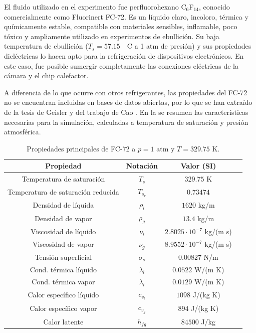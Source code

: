 El fluido utilizado en el experimento fue perfluorohexano C$_6$F$_{14}$, conocido comercialmente como Fluorinert FC-72. Es un l\'iquido claro, incoloro, t\'ermica y qu\'imicamente estable, compatible con materiales sensibles, inflamable, poco t\'oxico y ampliamente utilizado en experimentos de ebullici\'on. Su baja temperatura de ebullici\'on ($T_{s}=57.15$~\textordmasculine~C a 1 atm de presi\'on) y sus propiedades diel\'ectricas lo hacen apto para la refrigeraci\'on de dispositivos electr\'onicos. En este caso, fue posible sumergir completamente las conexiones el\'ectricas de la c\'amara y el chip calefactor.

A diferencia de lo que ocurre con otros refrigerantes, las propiedades del FC-72 no se encuentran incluidas en bases de datos abiertas, por lo que se han extra\'ido de la tesis de Geisler \cite{larson_geisler_buoyancy-driven_2007} y del trabajo de Cao \cite{cao_experimental_2019}. En la  se resumen las caracter\'isticas necesarias para la simulaci\'on, calculadas a temperatura de saturaci\'on y presi\'on atmosf\'erica.

\begin{table}[ht]
	\centering
    \begin{tabular}{c c c c}
	    \toprule
        \bf Propiedad & \bf Notaci\'on & \bf Valor (SI) \\
        \midrule
		Temperatura de saturaci\'on & $T_s$ & $329.75$ K \\
		Temperatura de saturaci\'on reducida & $T_{s_r}$ & $0.73474$ \\
		Densidad de l\'iquida & $\rho_l$ & $1620$ kg/m\sps{3} \\
		Densidad de vapor & $\rho_g$ & $13.4$ kg/m\sps{3} \\		
		Viscosidad de l\'iquido & $\nu_l$ & $2.8025 \cdot 10^{-7}$ kg/(m s) \\		
		Viscosidad de vapor & $\nu_g$ & $8.9552 \cdot 10^{-7}$ kg/(m s) \\
		Tensi\'on superficial & $\sigma_s$ & $0.00827$ N/m \\
		Cond. t\'ermica l\'iquido & $\lambda_l$ & $0.0522$ W/(m K) \\
		Cond. t\'ermica vapor & $\lambda_l$ & $0.0129$ W/(m K) \\
		Calor espec\'ifico l\'iquido & $c_{v_l}$ & $1098$ J/(kg K) \\
		Calor espec\'ifico vapor & $c_{v_g}$ & $894$ J/(kg K) \\
		Calor latente & $h_{fg}$ & $84500$ J/kg \\
        \bottomrule
	\end{tabular}
	\caption{Propiedades principales de FC-72 a $p=1$ atm y $T=329.75$ K.}
	\label{tab:fc72_prop}
\end{table} 
\FloatBarrier

